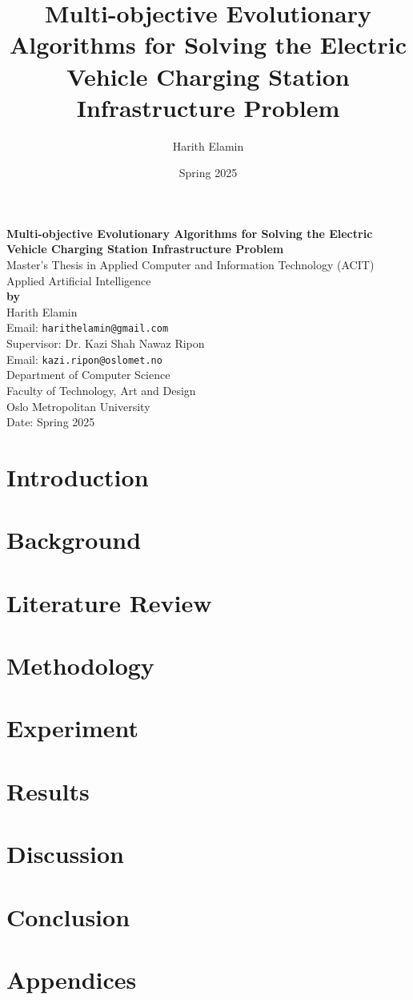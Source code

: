 \documentclass[12pt]{report}
\title{\Huge Multi-objective Evolutionary Algorithms for Solving the Electric Vehicle Charging Station Infrastructure Problem}
\author{\Large Harith Elamin}
\date{\Large Spring 2025}
\begin{document}
\begin{titlepage}
    \centering    
    \textbf{\Huge Multi-objective Evolutionary Algorithms for Solving the Electric Vehicle Charging Station Infrastructure Problem}\\[2em]
    
    \Large Master's Thesis in Applied Computer and Information Technology (ACIT)\\[1em]
    \Large Applied Artificial Intelligence\\[2em]
    
    \textbf{by}\\[1em]
    \Large Harith Elamin\\
    \Large Email: \texttt{harithelamin@gmail.com}\\[1em]   
    \Large Supervisor: Dr. Kazi Shah Nawaz Ripon\\
    \Large Email: \texttt{kazi.ripon@oslomet.no}\\[2em]
    
    \large Department of Computer Science\\
    \large Faculty of Technology, Art and Design\\
    \large Oslo Metropolitan University\\[2em]

    \large Date: Spring 2025
    
    \vfill  
\end{titlepage}
\newpage
\tableofcontents
\newpage
\listoffigures

\chapter{Introduction}

\chapter{Background}

\chapter{Literature Review}

\chapter{Methodology}

\chapter{Experiment}

\chapter{Results}

\chapter{Discussion}

\chapter{Conclusion}

\chapter*{Appendices}


\end{document}
